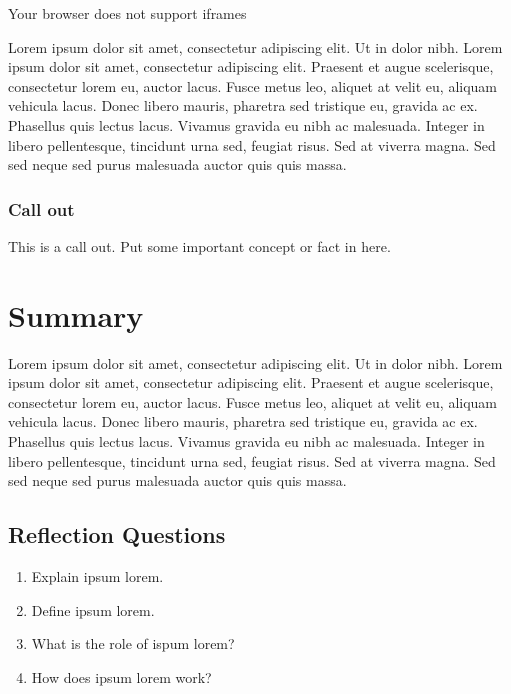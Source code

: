 \documentclass[
]{book}
\providecommand{\tightlist}{%
  \setlength{\itemsep}{0pt}\setlength{\parskip}{0pt}}
\begin{document}
Your browser does not support iframes

Lorem ipsum dolor sit amet, consectetur adipiscing elit. Ut in dolor nibh. Lorem ipsum dolor sit amet, consectetur adipiscing elit. Praesent et augue scelerisque, consectetur lorem eu, auctor lacus. Fusce metus leo, aliquet at velit eu, aliquam vehicula lacus. Donec libero mauris, pharetra sed tristique eu, gravida ac ex. Phasellus quis lectus lacus. Vivamus gravida eu nibh ac malesuada. Integer in libero pellentesque, tincidunt urna sed, feugiat risus. Sed at viverra magna. Sed sed neque sed purus malesuada auctor quis quis massa.

\hypertarget{call-out-1}{%
\subsubsection*{Call out}\label{call-out-1}}

This is a call out. Put some important concept or fact in here.

\hypertarget{summary-2}{%
\section{Summary}\label{summary-2}}

Lorem ipsum dolor sit amet, consectetur adipiscing elit. Ut in dolor nibh. Lorem ipsum dolor sit amet, consectetur adipiscing elit. Praesent et augue scelerisque, consectetur lorem eu, auctor lacus. Fusce metus leo, aliquet at velit eu, aliquam vehicula lacus. Donec libero mauris, pharetra sed tristique eu, gravida ac ex. Phasellus quis lectus lacus. Vivamus gravida eu nibh ac malesuada. Integer in libero pellentesque, tincidunt urna sed, feugiat risus. Sed at viverra magna. Sed sed neque sed purus malesuada auctor quis quis massa.

\hypertarget{reflection-questions-1}{%
\subsection*{Reflection Questions}\label{reflection-questions-1}}

\begin{enumerate}
\def\labelenumi{\arabic{enumi}.}
\tightlist
\item
  Explain ipsum lorem.
\item
  Define ipsum lorem.
\item
  What is the role of ispum lorem?
\item
  How does ipsum lorem work?
\end{enumerate}
\end{document}

